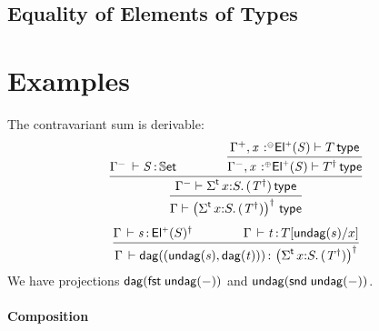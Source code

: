 \documentclass[11pt]{article}
\theoremstyle{plain}
\begin{document}

\subsection{Equality of Elements of Types}



\section{Examples}

The contravariant sum is derivable:
\begin{equation}
	\infer{
		\wftp{ \Gamma }{ \paren{\sigmatp{x}{S}{(T^\dagger)}}^\dagger }
	}{
		\infer{
			\wftp{ \Gamma^- }{ \sigmatp{x}{S}{(T^\dagger)} }
		}{
			\ofdtp{ \Gamma^- }{ S }{ \types }
			\qquad \qquad
			\infer{
				\wftp{\Gamma^-, \tptmv{x}{\coc}{\Elp S}}{T^\dagger}
			}{
				\wftp{\Gamma^+, \tptmv{x}{\conc}{\Elp S}}{T}
			}
		}	
	}
\end{equation}
\begin{equation}
	\infer{
		\oftp{\Gamma}{\dagtm{(\undag s, \dagtm t)}}{ \paren{\sigmatp{x}{S}{(T^\dagger)}}^\dagger }
	}{
		\oftp{\Gamma}{s}{\Elp S^\dagger}
		\qquad \qquad
		\oftp{\Gamma}{t}{\subst T {\undag s} x}
	}
\end{equation}
We have projections $\mathsf{dag}(\mathit{\mathsf{fst}_{} \: \mathsf{undag}(-)})$ and $\mathsf{undag}(\mathit{\mathsf{snd}_{} \: \mathsf{undag}(-)})$.

\paragraph{Composition}


\end{document}
